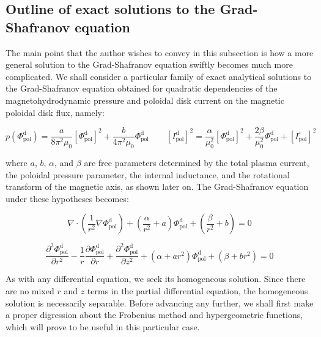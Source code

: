 \subsection{Outline of exact solutions to the Grad-Shafranov equation}

The main point that the author wishes to convey in this subsection is how a more general solution to the Grad-Shafranov equation swiftly becomes much more complicated. We shall consider a particular family of exact analytical solutions to the Grad-Shafranov equation obtained for quadratic dependencies of the magnetohydrodynamic pressure and poloidal disk current on the magnetic poloidal disk flux, namely:

\begin{equation}
    p(\Phi_\text{pol}^\mathrm{d})=\frac{a}{8\pi^2\mu_0}\left[\Phi_\text{pol}^\mathrm{d}\right]^2+\frac{b}{4\pi^2\mu_0}\Phi_\text{pol}^\mathrm{d}\qquad \left[I_\text{pol}^\mathrm{d}\right]^2=\frac{\alpha}{\mu_0^2}\left[\Phi_\text{pol}^\mathrm{d}\right]^2+\frac{2\beta}{\mu_0^2}\Phi_\text{pol}^\mathrm{d}+\left[I_\text{pol}^\square\right]^2
\end{equation}

where $a$, $b$, $\alpha$, and $\beta$ are free parameters determined by the total plasma current, the poloidal pressure parameter, the internal inductance, and the rotational transform of the magnetic axis, as shown later on. The Grad-Shafranov equation under these hypotheses becomes:

\begin{equation}
    \label{eq-6-87xxx}
    \nabla\cdot\left(\frac{1}{r^2}\nabla\Phi_\text{pol}^\mathrm{d}\right)+\left(\frac{\alpha}{r^2}+a\right)\Phi_\text{pol}^\mathrm{d}+\left(\frac{\beta}{r^2}+b\right)=0
\end{equation}

\begin{equation}
    \label{eq-6-88x}
    \frac{\partial^2\Phi_\text{pol}^\mathrm{d}}{\partial r^2}-\frac{1}{r}\frac{\partial\Phi_\text{pol}^\mathrm{d}}{\partial r}+\frac{\partial^2\Phi_\text{pol}^\mathrm{d}}{\partial z^2}+\left(\alpha+ar^2\right)\Phi_\text{pol}^\mathrm{d}+\left(\beta+br^2\right)=0
\end{equation}

As with any differential equation, we seek its homogeneous solution. Since there are no mixed $r$ and $z$ terms in the partial differential equation, the homogeneous solution is necessarily separable. Before advancing any further, we shall first make a proper digression about the Frobenius method and hypergeometric functions, which will prove to be useful in this particular case.

